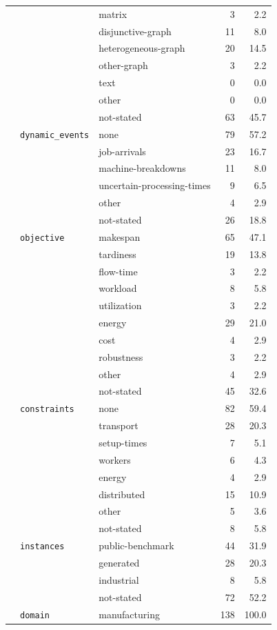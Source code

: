 \begin{longtable}{lllr@{\hspace{1.0em}}r}
 &  & matrix & 3 & 2.2 \\
 &  & disjunctive-graph & 11 & 8.0 \\
 &  & heterogeneous-graph & 20 & 14.5 \\
 &  & other-graph & 3 & 2.2 \\
 &  & text & 0 & 0.0 \\
 &  & other & 0 & 0.0 \\
 &  & not-stated & 63 & 45.7 \\
 & \texttt{dynamic\_events} & none & 79 & 57.2 \\
 &  & job-arrivals & 23 & 16.7 \\
 &  & machine-breakdowns & 11 & 8.0 \\
 &  & uncertain-processing-times & 9 & 6.5 \\
 &  & other & 4 & 2.9 \\
 &  & not-stated & 26 & 18.8 \\
 & \texttt{objective} & makespan & 65 & 47.1 \\
 &  & tardiness & 19 & 13.8 \\
 &  & flow-time & 3 & 2.2 \\
 &  & workload & 8 & 5.8 \\
 &  & utilization & 3 & 2.2 \\
 &  & energy & 29 & 21.0 \\
 &  & cost & 4 & 2.9 \\
 &  & robustness & 3 & 2.2 \\
 &  & other & 4 & 2.9 \\
 &  & not-stated & 45 & 32.6 \\
 & \texttt{constraints} & none & 82 & 59.4 \\
 &  & transport & 28 & 20.3 \\
 &  & setup-times & 7 & 5.1 \\
 &  & workers & 6 & 4.3 \\
 &  & energy & 4 & 2.9 \\
 &  & distributed & 15 & 10.9 \\
 &  & other & 5 & 3.6 \\
 &  & not-stated & 8 & 5.8 \\
 & \texttt{instances} & public-benchmark & 44 & 31.9 \\
 &  & generated & 28 & 20.3 \\
 &  & industrial & 8 & 5.8 \\
 &  & not-stated & 72 & 52.2 \\
 & \texttt{domain} & manufacturing & 138 & 100.0 \\

\end{longtable}
